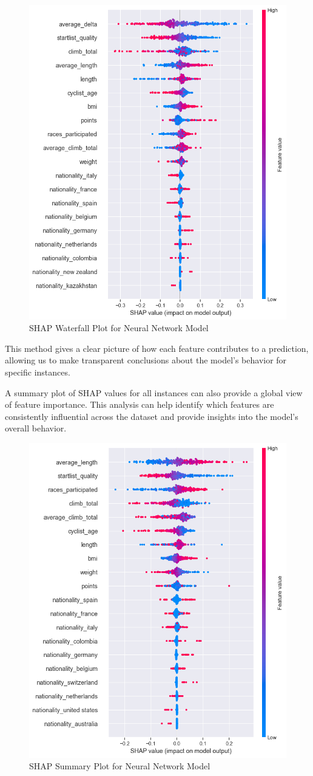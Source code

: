 \documentclass{article}
\begin{document}
\begin{figure}[H]
    \centering
    \includegraphics[width=0.75\linewidth]{shap_nn.png}
    \caption{SHAP Waterfall Plot for Neural Network Model}
    \label{fig:shap_nn}
\end{figure}

This method gives a clear picture of how each feature contributes to a prediction, allowing us to make transparent conclusions about the model’s behavior for specific instances.


A summary plot of SHAP values for all instances can also provide a global view of feature importance. This analysis can help identify which features are consistently influential across the dataset and provide insights into the model's overall behavior.

\begin{figure}[H]
    \centering
    \includegraphics[width=0.75\linewidth]{shap_summary_nn.png}
    \caption{SHAP Summary Plot for Neural Network Model}
    \label{fig:shap_summary_nn}
\end{figure}
\end{document}
